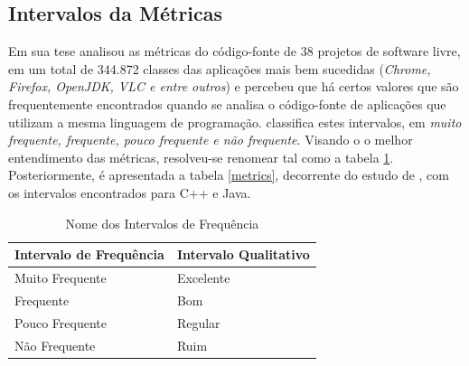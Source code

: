 \subsection{Intervalos da Métricas}
\label{Intervalos das Métricas}
Em sua tese  analisou as métricas do código-fonte de 
38 projetos de software livre, em um total de 344.872 classes das aplicações 
mais bem sucedidas (\textit{Chrome, Firefox, OpenJDK, VLC e entre outros}) e 
percebeu que há certos valores que são frequentemente encontrados quando se 
analisa o código-fonte de aplicações que utilizam a mesma linguagem de 
programação.  classifica estes intervalos, em 
\textit{muito frequente, frequente, pouco frequente e não frequente}. Visando o 
o melhor entendimento das métricas, resolveu-se renomear tal como a tabela 
\ref{nomes}. Posteriormente, é apresentada a tabela \ref{metrics}, decorrente do
estudo de , com os intervalos encontrados para C++ e 
Java.

	\begin{table}[!ht]
	\begin{center}
	 \begin{tabular}{|l|l|}
		\hline
		Intervalo de Frequência & Intervalo Qualitativo \\ \hline
		Muito Frequente & Excelente \\ \hline
		Frequente       & Bom       \\ \hline
		Pouco Frequente & Regular   \\ \hline
		Não Frequente   & Ruim      \\ \hline
		\end{tabular}
		\caption{Nome dos Intervalos de Frequência}
		\label{nomes}
		\end{center}
		\end{table}

